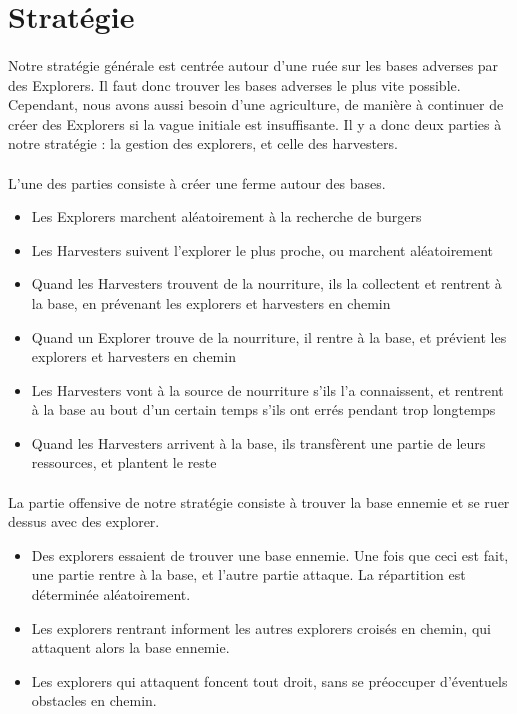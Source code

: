 \documentclass{article}
\begin{document}
\section{Stratégie}

\paragraph{}

Notre stratégie générale est centrée autour d'une ruée sur les bases adverses par des Explorers.
Il faut donc trouver les bases adverses le plus vite possible.
Cependant, nous avons aussi besoin d'une agriculture, de manière à continuer de créer des Explorers si la vague initiale est insuffisante.
Il y a donc deux parties à notre stratégie : la gestion des explorers, et celle des harvesters.

\paragraph{}
L'une des parties consiste à créer une ferme autour des bases.
\begin{itemize}
	\item Les Explorers marchent aléatoirement à la recherche de burgers
        \item Les Harvesters suivent l'explorer le plus proche, ou marchent aléatoirement
        \item Quand les Harvesters trouvent de la nourriture, ils la collectent et rentrent à la base, en prévenant les explorers et harvesters en chemin
        \item Quand un Explorer trouve de la nourriture, il rentre à la base, et prévient les explorers et harvesters en chemin
        \item Les Harvesters vont à la source de nourriture s'ils l'a connaissent, et rentrent à la base au bout d'un certain temps s'ils ont errés pendant trop longtemps
        \item Quand les Harvesters arrivent à la base, ils transfèrent une partie de leurs ressources, et plantent le reste
\end{itemize}

\paragraph{}
La partie offensive de notre stratégie consiste à trouver la base ennemie et se ruer dessus avec des explorer.
\begin{itemize}
	\item Des explorers essaient de trouver une base ennemie. Une fois que ceci est fait, une partie rentre à la base, et l'autre partie attaque. La répartition est déterminée aléatoirement.
        \item Les explorers rentrant informent les autres explorers croisés en chemin, qui attaquent alors la base ennemie.
        \item Les explorers qui attaquent foncent tout droit, sans se préoccuper d'éventuels obstacles en chemin.
\end{itemize}
\end{document}
